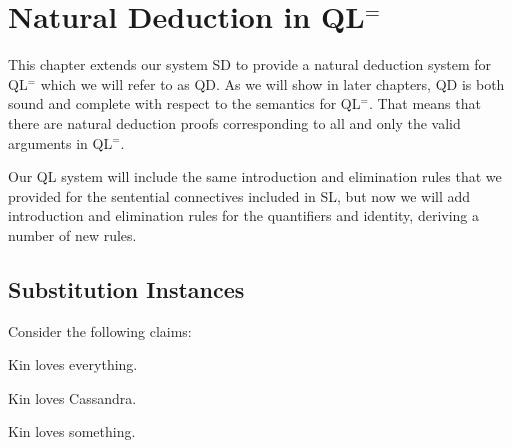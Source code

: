 ﻿%
\chapter{Natural Deduction in QL$^=$}
\label{ch.FOL-deduction}



This chapter extends our system SD to provide a natural deduction system for QL$^=$ which we will refer to as QD.
As we will show in later chapters, QD is both sound and complete with respect to the semantics for QL$^=$.
That means that there are natural deduction proofs corresponding to all and only the valid arguments in QL$^=$.

Our QL system will include the same introduction and elimination rules that we provided for the sentential connectives included in SL, but now we will add introduction and elimination rules for the quantifiers and identity, deriving a number of new rules.



\section{Substitution Instances}


Consider the following claims:

\begin{earg}
  \item[\ex{I1}] Kin loves everything.
  \item[\ex{I2}] Kin loves Cassandra.
  \item[\ex{I3}] Kin loves something.
\end{earg}

